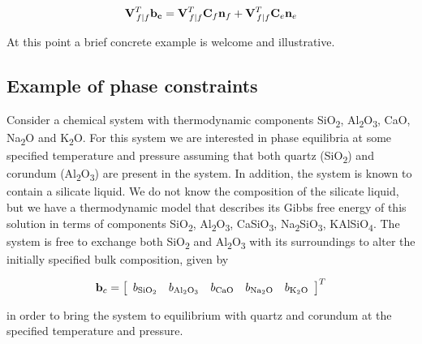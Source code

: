 \documentclass[11pt, titlepage, twoside]{article}
\begin{document}
\begin{MPEquation}[!ht]
\begin{equation}
{\bf{V}}_{\left. f \right|f}^T{{\bf{b}}_{\bf{c}}} = {\bf{V}}_{\left. f \right|f}^T{{\bf{C}}_f}{{\bf{n}}_f} + {\bf{V}}_{\left. f \right|f}^T{{\bf{C}}_e}{{\bf{n}}_e}
\end{equation}
\label{MPEquationElement:9492D404-9C9A-4350-C66C-487C1B1942BF}
\end{MPEquation}
At this point a brief concrete example is welcome and illustrative.


\subsection{Example of phase constraints}\label{MPSection:B3C87549-4E0E-449C-A324-EC09BD655C23}

Consider a chemical system with thermodynamic components SiO\textsubscript{2}, Al\textsubscript{2}O\textsubscript{3}, CaO, Na\textsubscript{2}O and K\textsubscript{2}O. For this system we are interested in phase equilibria at some specified temperature and pressure assuming that both quartz (SiO\textsubscript{2}) and corundum (Al\textsubscript{2}O\textsubscript{3}) are present in the system. In addition, the system is known to contain a silicate liquid. We do not know the composition of the silicate liquid, but we have a thermodynamic model that describes its Gibbs free energy of this solution in terms of components SiO\textsubscript{2}, Al\textsubscript{2}O\textsubscript{3}, CaSiO\textsubscript{3}, Na\textsubscript{2}SiO\textsubscript{3}, KAlSiO\textsubscript{4}. The system is free to exchange both SiO\textsubscript{2} and Al\textsubscript{2}O\textsubscript{3} with its surroundings to alter the initially specified bulk composition, given by


\begin{MPEquation}[!ht]
\begin{equation}
{{\bf{b}}_c} = {\left[ {\begin{array}{*{20}{c}}
{{b_{{\rm{Si}}{{\rm{O}}_2}}}}&{{b_{{\rm{A}}{{\rm{l}}_2}{{\rm{O}}_3}}}}&{{b_{{\rm{CaO}}}}}&{{b_{{\rm{N}}{{\rm{a}}_2}{\rm{O}}}}}&{{b_{{{\rm{K}}_2}{\rm{O}}}}}
\end{array}} \right]^T}
\end{equation}
\label{MPEquationElement:59783F1B-FF14-4CA7-CFC5-7073E0E88D81}
\end{MPEquation}
in order to bring the system to equilibrium with quartz and corundum at the specified temperature and pressure.
\end{document}
